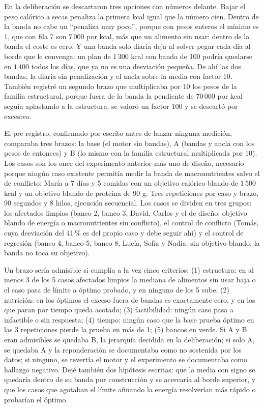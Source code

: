 En la deliberación se descartaron tres opciones con números delante. Bajar el peso calórico a secas penaliza la primera kcal igual que la número cien. Dentro de la banda no cabe un ``penaliza muy poco'', porque con pesos enteros el mínimo es 1, que con fila 7 son $7\,000$ por kcal, más que un alimento sin usar: dentro de la banda el coste es cero. Y una banda solo diaria deja al solver pegar cada día al borde que le convenga: un plan de $1\,300$ kcal con banda de 100 podría quedarse en $1\,400$ todos los días, que ya no es una desviación pequeña. De ahí las dos bandas, la diaria sin penalización y el ancla sobre la media con factor 10. También registré un segundo brazo que multiplicaba por 10 los pesos de la familia estructural, porque fuera de la banda la pendiente de $70\,000$ por kcal seguía aplastando a la estructura; se valoró un factor 100 y se descartó por excesivo.

El pre-registro, confirmado por escrito antes de lanzar ninguna medición, comparaba tres brazos: la base (el motor sin bandas), A (bandas y ancla con los pesos de entonces) y B (lo mismo con la familia estructural multiplicada por 10). Los casos son los once del experimento anterior más uno de diseño, necesario porque ningún caso existente permitía medir la banda de macronutrientes salvo el de conflicto: María a 7 días y 5 comidas con un objetivo calórico blando de $1\,500$ kcal y un objetivo blando de proteína de 90 g. Tres repeticiones por caso y brazo, 90 segundos y 8 hilos, ejecución secuencial. Los casos se dividen en tres grupos: los afectados limpios (banco 2, banco 3, David, Carlos y el de diseño: objetivo blando de energía o macronutrientes sin conflicto), el control de conflicto (Tomás, cuya desviación del 41\,\% es del propio caso y debe seguir ahí) y el control de regresión (banco 4, banco 5, banco 8, Lucía, Sofía y Nadia: sin objetivo blando, la banda no toca su objetivo).

Un brazo sería admisible si cumplía a la vez cinco criterios: (1) estructura: en al menos 3 de los 5 casos afectados limpios la mediana de alimentos sin usar baja o el caso pasa de límite a óptimo probado, y en ninguno de los 5 sube; (2) nutrición: en los óptimos el exceso fuera de bandas es exactamente cero, y en los que paran por tiempo queda acotado; (3) factibilidad: ningún caso pasa a infactible o sin respuesta; (4) tiempo: ningún caso que la base prueba óptimo en las 3 repeticiones pierde la prueba en más de 1; (5) bancos en verde. Si A y B eran admisibles se quedaba B, la jerarquía decidida en la deliberación; si solo A, se quedaba A y la reponderación se documentaba como no sostenida por los datos; si ninguno, se revertía el motor y el experimento se documentaba como hallazgo negativo. Dejé también dos hipótesis escritas: que la media con signo se quedaría dentro de su banda por construcción y se acercaría al borde superior, y que los casos que agotaban el límite afinando la energía resolverían más rápido o probarían el óptimo.

